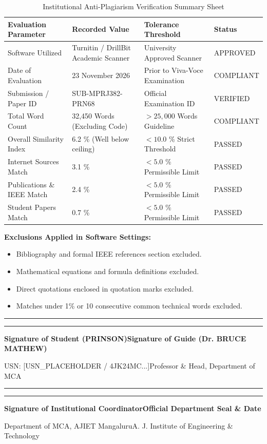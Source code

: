 \documentclass[12pt,letterpaper,oneside]{report}
\begin{document}
\begin{table}[H]
\centering
\caption{Institutional Anti-Plagiarism Verification Summary Sheet}
\label{tab:plagiarism_summary}
\begin{tabularx}{\textwidth}{|l|X|l|l|}
\hline
\textbf{Evaluation Parameter} & \textbf{Recorded Value} & \textbf{Tolerance Threshold} & \textbf{Status}\\ \hline
Software Utilized & Turnitin / DrillBit Academic Scanner & University Approved Scanner & APPROVED\\ \hline
Date of Evaluation & 23 November 2026 & Prior to Viva-Voce Examination & COMPLIANT\\ \hline
Submission / Paper ID & SUB-MPRJ382-PRN68 & Official Examination ID & VERIFIED\\ \hline
Total Word Count & 32,450 Words (Excluding Code) & $> 25{,}000$ Words Guideline & COMPLIANT\\ \hline
Overall Similarity Index & 6.2 \% (Well below ceiling) & $< 10.0$ \% Strict Threshold & PASSED\\ \hline
Internet Sources Match & 3.1 \% & $< 5.0$ \% Permissible Limit & PASSED\\ \hline
Publications \& IEEE Match & 2.4 \% & $< 5.0$ \% Permissible Limit & PASSED\\ \hline
Student Papers Match & 0.7 \% & $< 5.0$ \% Permissible Limit & PASSED\\ \hline
\end{tabularx}
\end{table}

\noindent\textbf{Exclusions Applied in Software Settings:}
\begin{itemize}
    \item Bibliography and formal IEEE references section excluded.
    \item Mathematical equations and formula definitions excluded.
    \item Direct quotations enclosed in quotation marks excluded.
    \item Matches under 1\% or 10 consecutive common technical words excluded.
\end{itemize}

\vspace{1.5in}
\noindent\rule{2.5in}{0.5pt}\hfill\rule{2.5in}{0.5pt}\par
\noindent\textbf{Signature of Student (PRINSON)}\hfill\textbf{Signature of Guide (Dr. BRUCE MATHEW)}\par
\noindent USN: [USN\_PLACEHOLDER / 4JK24MC...]\hfill Professor \& Head, Department of MCA\par
\vspace{0.8in}
\noindent\rule{2.5in}{0.5pt}\hfill\rule{2.5in}{0.5pt}\par
\noindent\textbf{Signature of Institutional Coordinator}\hfill\textbf{Official Department Seal \& Date}\par
\noindent Department of MCA, AJIET Mangaluru\hfill A. J. Institute of Engineering \& Technology
\end{document}
